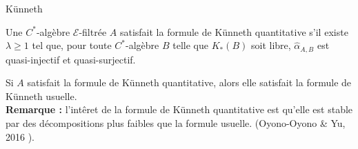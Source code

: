 \begin{frame}{Künneth}
\begin{definitionfr}
Une $C^*$-algèbre $\mathcal E$-filtrée $A$ satisfait la formule de Künneth quantitative s'il existe $\lambda \geq 1$ tel que, pour toute $C^*$-algèbre $B$ telle que $K_*(B)$ soit libre, $\hat\alpha_{A,B}$ est quasi-injectif et quasi-surjectif. 
\end{definitionfr}

Si $A$ satisfait la formule de Künneth quantitative, alors elle satisfait la formule de Künneth usuelle.\\
\vspace{0.3 cm}
\textbf{Remarque :} l'intêret de la formule de Künneth quantitative est qu'elle est stable par des décompositions plus faibles que la formule usuelle. (Oyono-Oyono \& Yu, 2016 \cite{OY4}).
\end{frame}

